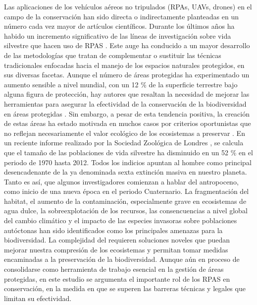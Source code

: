 \documentclass[11pt,]{article}
\begin{document}
Las aplicaciones de los vehículos aéreos no tripulados (RPAs, UAVs,
drones) en el campo de la conservación han sido directa o indirectamente
planteadas en un número cada vez mayor de artículos científicos. Durante
los últimos años ha habido un incremento significativo de las líneas de
investigación sobre vida silvestre que hacen uso de RPAS
\citep{Linchant2015}. Este auge ha conducido a un mayor desarrollo de
las metodologías que tratan de complementar o sustituir las técnicas
tradicionales enfocadas hacia el manejo de los espacios naturales
protegidos, en sus diversas facetas. Aunque el número de áreas
protegidas ha experimentado un aumento sensible a nivel mundial, con un
12 \% de la superficie terrestre bajo alguna figura de protección, hay
autores que resaltan la necesidad de mejorar las herramientas para
asegurar la efectividad de la conservación de la biodiversidad en áreas
protegidas \citep{Chape2005}. Sin embargo, a pesar de esta tendencia
positiva, la creación de estas áreas ha estado motivada en muchos casos
por criterios oportunistas que no reflejan necesariamente el valor
ecológico de los ecosistemas a preservar \citep{Knight2007}. En un
reciente informe realizado por la Sociedad Zoológica de Londres
\citep{Living2016} , se calcula que el tamaño de las poblaciones de vida
silvestre ha disminuido en un 52 \% en el periodo de 1970 hasta 2012.
Todos los indicios apuntan al hombre como principal desencadenante de la
ya denominada sexta extinción masiva en nuestro planeta. Tanto es así,
que algunos investigadores comienzan a hablar del antropoceno, como
inicio de una nueva época en el periodo Cuaternario. La fragmentación
del habitat, el aumento de la contaminación, especialmente grave en
ecosistemas de agua dulce, la sobreexplotación de los recursos, las
consencuencias a nivel global del cambio climático y el impacto de las
especies invasoras sobre poblaciones autóctonas han sido identificados
como los principales amenazas para la biodiversidad. La complejidad del
requieren soluciones noveles que puedan mejorar nuestra compresión de
los ecosistemas y permitan tomar medidas encaminadas a la preservación
de la biodiversidad. Aunque aún en proceso de consolidarse como
herramienta de trabajo esencial en la gestión de áreas protegidas, en
este estudio se argumenta el importante rol de los RPAS en conservación,
en la medida en que se superen las barreras técnicas y legales que
limitan su efectividad.
\end{document}
